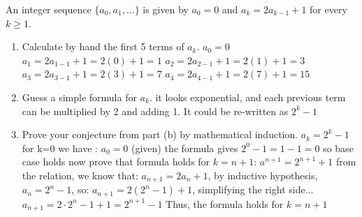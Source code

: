 \documentclass{article}
\begin{document}
	An integer sequence $\{a_0, a_1, \dots\}$ is given by $a_0 = 0$ and $a_k = 2a_{k-1} + 1$ for every $k \geq 1$.
	\begin{enumerate}
		\item Calculate by hand the first 5 terms of $a_k$.
		\subitem $a_0 =  0$
		\subitem $a_1 = 2a_{1-1} + 1 = 2(0)+1 = 1$
		\subitem $a_2 = 2a_{2-1} + 1 = 2(1)+1 = 3$
		\subitem $a_3 = 2a_{3-1} + 1 = 2(3)+1 = 7$
		\subitem $a_4 = 2a_{4-1} + 1 = 2(7)+1 = 15$
		
		\item Guess a simple formula for $a_k$.
		\subitem it looks exponential, and each previous term can be multiplied by 2 and adding 1. It could be re-written as $2^k-1$
		\item Prove your conjecture from part (b) by mathematical induction.
		\subitem $a_k = 2^k-1$ for k=0 we have : $a_0 = 0$ (given)
		\subitem the formula gives $2^0 -1 = 1-1 = 0$ so base case holds
		\subitem now prove that formula holds for $k = n+1$:
		\subitem $a^{n+1} = 2^{n+1} + 1$
		\subitem from the relation, we know that: $a_{n+1} = 2a_n+1$, 
		\subitem by inductive hypothesis, $a_n = 2^n-1$, so:
		\subitem $a_{n+1} = 2(2^n-1)+1$, simplifying the right side...
		\subitem $a_{n+1} = 2\cdot 2^n-1+1 = 2^{n+1}-1$ 
		\subitem Thus, the formula holds for $k=n+1$
	\end{enumerate}
	
\end{document}
